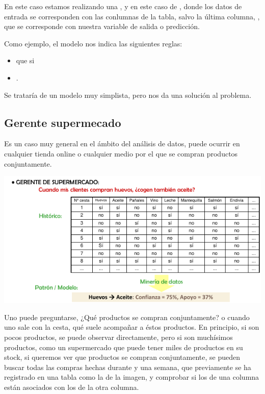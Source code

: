 En este caso estamos realizando una , y en este caso de , donde los datos de entrada se corresponden con las conlumnas de la tabla, salvo la última columna, , que se corresponde con nuestra variable de salida o predicción.

Como ejemplo, el modelo nos indica las siguientes reglas:
\begin{itemize}
    \item que si 
    \item {}.
\end{itemize}

Se trataría de un modelo muy simplista, pero nos da una solución al problema.

\subsection{Gerente supermecado}


Es un caso muy general en el ámbito del análisis de datos, puede ocurrir en cualquier tienda online o cualquier medio por el que se compran productos conjuntamente.

\begin{center}
    \includegraphics[scale=.8]{images/mod01-04.png}
\end{center}

Uno puede preguntarse, ¿Qué productos se compran conjuntamente? o cuando uno sale con la cesta, qué suele acompañar a éstos productos. En principio, si son pocos productos, se puede observar directamente, pero si son muchísimos productos, como un supermercado que puede tener miles de productos en su stock, si queremos ver que productos se compran conjuntamente, se pueden buscar todas las compras hechas durante y una semana, que previamente se ha registrado en una tabla como la de la imagen, y comprobar si los  de una columna están asociados con los  de la otra columna.

